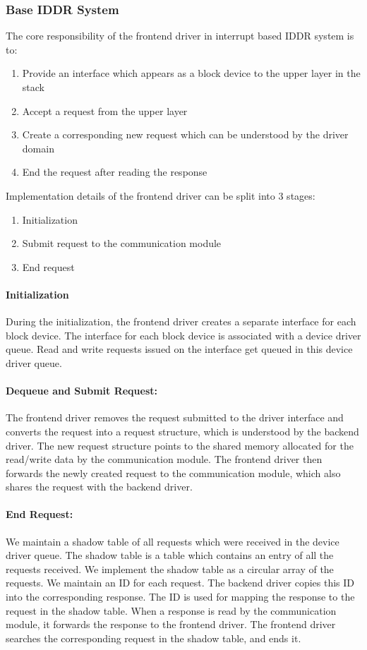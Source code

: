 \subsubsection*{Base IDDR System}
The core responsibility of the frontend driver in interrupt based IDDR system is to:
\begin{enumerate}
\item Provide an interface which appears as a block device to the upper layer in the stack
\item Accept a request from the upper layer
\item Create a corresponding new request which can be understood by the driver domain
\item End the request after reading the response
\end{enumerate}

Implementation details of the frontend driver can be split into 3 stages: 
\begin{enumerate}
\item Initialization
\item Submit request to the communication module
\item End request
\end{enumerate}

\paragraph{Initialization}
During the initialization, the frontend driver creates a separate interface for each block device. The interface for each block device is associated with a device driver queue. Read and write requests issued on the interface get queued in this device driver queue.

\paragraph{Dequeue and Submit Request:}
The frontend driver removes the request submitted to the driver interface and converts the request into a request structure, which is understood by the backend driver. The new request structure points to the shared memory allocated for the read/write data by the communication module. The frontend driver then forwards the newly created request to the communication module, which also shares the request with the backend driver.

\paragraph{End Request:}
We maintain a shadow table of all requests which were received in the device driver queue. The shadow table is a table which contains an entry of all the requests received. We implement the shadow table as a circular array of the requests. We maintain an ID for each request. The backend driver copies this ID into the corresponding response. The ID is used for mapping the response to the request in the shadow table. When a response is read by the communication module, it forwards the response to the frontend driver. The frontend driver searches the corresponding request in the shadow table, and ends it. 

